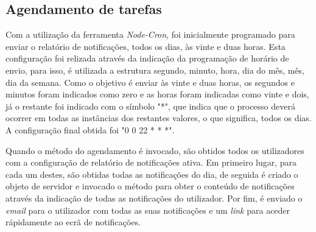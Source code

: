 \subsection{Agendamento de tarefas}

Com a utilização da ferramenta \textit{Node-Cron}, foi inicialmente programado para enviar o relatório de notificações, todos os dias, às vinte e duas horas. Esta configuração foi relizada através da indicação da programação de horário de envio, para isso, é utilizada a estrutura segundo, minuto, hora, dia do mês, mês, dia da semana. Como o objetivo é enviar às vinte e duas horas, os segundos e minutos foram indicados como zero e as horas foram indicadas como vinte e dois, já o restante foi indicado com o símbolo "*", que indica que o processo deverá ocorrer em todas as instâncias dos restantes valores, o que significa, todos os dias. A configuração final obtida foi "0 0 22 * * *".

Quando o método do agendamento é invocado, são obtidos todos os utilizadores com a configuração de relatório de notificações ativa. Em primeiro lugar, para cada um destes, são obtidas todas as notificações do dia, de seguida é criado o objeto de servidor e invocado o método para obter o conteúdo de notificações através da indicação de todas as notificações do utilizador. Por fim, é enviado o \textit{email} para o utilizador com todas as suas notificações e um \textit{link} para aceder rápidamente ao ecrã de notificações.